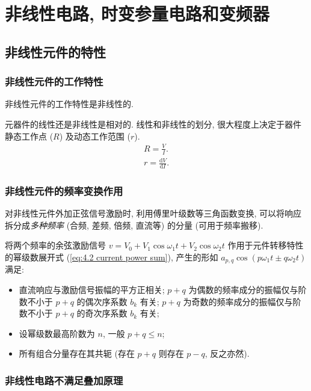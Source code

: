 \section{非线性电路, 时变参量电路和变频器} \label{非线性电路, 时变参量电路和变频器}
\subsection{非线性元件的特性} \label{非线性元件的特性}
\subsubsection{非线性元件的工作特性}

非线性元件的工作特性是非线性的.

元器件的线性还是非线性是相对的. 线性和非线性的划分, 很大程度上决定于器件静态工作点 ($R$) 及动态工作范围 ($r$).
\begin{gather}
    R=\frac{V}{I}. \\
    r=\frac{\mathrm{d}V}{\mathrm{d}I}.
\end{gather}

\subsubsection{非线性元件的频率变换作用}

对非线性元件外加正弦信号激励时, 利用傅里叶级数等三角函数变换, 可以将响应拆分成\textit{多种频率} (合频, 差频, 倍频, 直流等) 的分量 (可用于频率搬移).

将两个频率的余弦激励信号 $v=V_0+V_1\cos\omega_1 t+V_2\cos\omega_2 t$ 作用于元件转移特性的幂级数展开式 (\ref{eq:4.2 current power sum}), 产生的形如 $a_{p,q}\cos(p\omega_1 t\pm q\omega_2 t)$ 满足:
\begin{itemize}
    \item 直流响应与激励信号振幅的平方正相关; $p+q$ 为偶数的频率成分的振幅仅与阶数不小于 $p+q$ 的偶次序系数 $b_k$ 有关; $p+q$ 为奇数的频率成分的振幅仅与阶数不小于 $p+q$ 的奇次序系数 $b_k$ 有关;
    \item 设幂级数最高阶数为 $n$, 一般 $p+q\leq n$;
    \item 所有组合分量存在其共轭 (存在 $p+q$ 则存在 $p-q$, 反之亦然).
\end{itemize}

\subsubsection{非线性电路不满足叠加原理}
